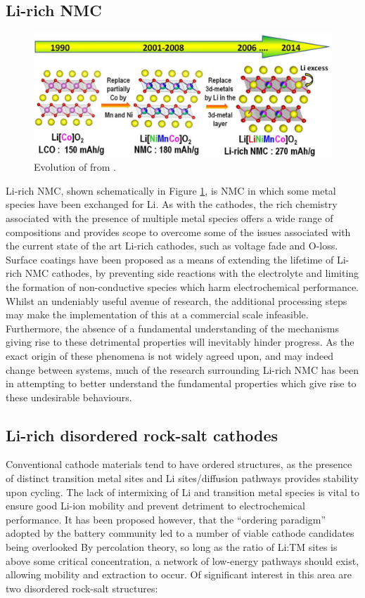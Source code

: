 \subsection{Li-rich NMC}
\begin{figure}
\centering
\includegraphics[width=\linewidth]{figures/structures/tarasconNMC}
\caption{Evolution of  from .\cite{Rozier2015}} 
\label{fig:tarasconNMC}
\end{figure}

Li-rich NMC, shown schematically in Figure \ref{fig:tarasconNMC}, is NMC in which some metal species have been exchanged for Li.
As with the  cathodes, the rich chemistry associated with the presence of multiple metal species offers a wide range of compositions and provides scope to overcome some of the issues associated with the current state of the art Li-rich cathodes, such as voltage fade and O-loss.
Surface coatings have been proposed as a means of extending the lifetime of Li-rich NMC cathodes, by preventing side reactions with the electrolyte and limiting the formation of non-conductive species which harm electrochemical performance.
Whilst an undeniably useful avenue of research, the additional processing steps may make the implementation of this at a commercial scale infeasible.
Furthermore, the absence of a fundamental understanding of the mechanisms giving rise to these detrimental properties will inevitably hinder progress.
As the exact origin of these phenomena is not widely agreed upon, and may indeed change between systems, much of the research surrounding Li-rich NMC has been in attempting to better understand the fundamental properties which give rise to these undesirable behaviours.


\newpage
\subsection{Li-rich disordered rock-salt cathodes}
Conventional cathode materials tend to have ordered structures, as the presence of distinct transition metal sites and Li sites/diffusion pathways provides stability upon cycling.
The lack of intermixing of Li and transition metal species is vital to ensure good Li-ion mobility and prevent detriment to electrochemical performance.
It has been proposed however, that the ``ordering paradigm'' adopted by the battery community led to a number of viable cathode candidates being overlooked \cite{Casimir2014}
By percolation theory, so long as the ratio of Li:TM sites is above some critical concentration, a network of low-energy pathways should exist, allowing mobility and extraction to occur.\cite{Urban2014}
Of significant interest in this area are two disordered rock-salt structures:

